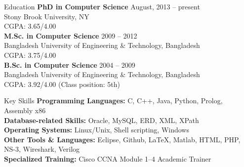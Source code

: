 \documentclass{resume} %
\begin{document}
 \titlespacing{\section}{0pt}{\parskip}{-\parskip}

\begin{rSection}{Education}
{\bf PhD in Computer Science} \hfill {August, 2013 -- present} \\ 
Stony Brook University, NY \\ 
CGPA: 3.65/4.00 \\[4pt]
{\bf M.Sc. in Computer Science} \hfill {2009 -- 2012} \\ 
Bangladesh University of Engineering \& Technology, Bangladesh \\
CGPA: 3.75/4.00 \\[4pt]
{\bf B.Sc. in Computer Science} \hfill {2004 -- 2009} \\ 
Bangladesh University of Engineering \& Technology, Bangladesh \\ 
CGPA: 3.92/4.00 (Class position: 5th)
\end{rSection}
\begin{rSection}{Key Skills}
\textbf{Programming Languages: }C, C++, Java, Python, Prolog, Assembly x86 \\ 
\textbf{Database-related Skills: } Oracle, MySQL, ERD, XML, XPath\\ 
\textbf{Operating Systems: }Linux/Unix, Shell scripting, Windows\\ 
\textbf{Other Tools \& Languages: }Eclipse, Github, \LaTeX{}, Matlab, HTML,
PHP, NS-3, Wireshark, Verilog\\
\textbf{Specialized Training: }Cisco CCNA Module 1--4 Academic Trainer 
\end{rSection}  
\end{document}
